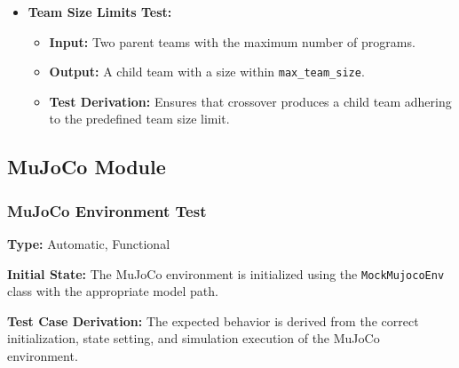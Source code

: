 \documentclass[12pt, titlepage]{article}
\begin{document}
\begin{itemize}
    \item \textbf{Team Size Limits Test:}
    \begin{itemize}
        \item \textbf{Input:} Two parent teams with the maximum number of programs.
        \item \textbf{Output:} A child team with a size within \texttt{max\_team\_size}.
        \item \textbf{Test Derivation:} Ensures that crossover produces a child team adhering to the predefined team size limit.
    \end{itemize}
\end{itemize}



\subsection{MuJoCo Module}

\subsubsection{MuJoCo Environment Test}


\textbf{Type:} Automatic, Functional

\textbf{Initial State:} The MuJoCo environment is initialized using the \texttt{MockMujocoEnv} class with the appropriate model path.

\textbf{Test Case Derivation:} The expected behavior is derived from the correct initialization, state setting, and simulation execution of the MuJoCo environment.
\end{document}
